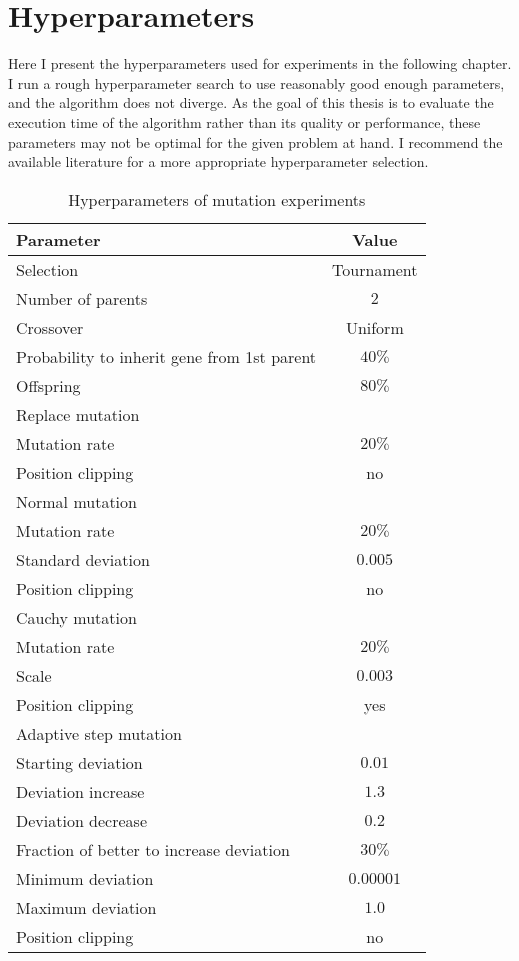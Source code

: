 \chapter{Hyperparameters}
\label{chap:hyperparameters}

Here I present the hyperparameters used for experiments in the following chapter. I run a rough hyperparameter search to use reasonably good enough parameters, and the algorithm does not diverge. As the goal of this thesis is to evaluate the execution time of the algorithm rather than its quality or performance, these parameters may not be optimal for the given problem at hand. I recommend the available literature for a more appropriate hyperparameter selection. 

\begin{table}[ht]
    \centering
    \begin{tabular}{|l|c|}
        \hline
        \textbf{Parameter} & \textbf{Value} \\
        \hline
        Selection & Tournament \\
        \quad Number of parents & $2$ \\
        Crossover & Uniform \\
        \quad Probability to inherit gene from 1st parent & $40\%$ \\
        \quad Offspring & $80\%$ \\
        \hline
        Replace mutation & \\
        \quad Mutation rate & $20\%$ \\
        \quad Position clipping & no \\
        Normal mutation & \\
        \quad Mutation rate & $20\%$ \\
        \quad Standard deviation & $0.005$ \\
        \quad Position clipping & no \\
        Cauchy mutation & \\
        \quad Mutation rate & $20\%$ \\
        \quad Scale & $0.003$ \\
        \quad Position clipping & yes \\
        Adaptive step mutation & \\
        \quad Starting deviation & $0.01$ \\
        \quad Deviation increase & $1.3$ \\
        \quad Deviation decrease & $0.2$ \\
        \quad Fraction of better to increase deviation & $30\%$ \\
        \quad Minimum deviation & $0.00001$ \\
        \quad Maximum deviation & $1.0$ \\
        \quad Position clipping & no \\
        \hline
    \end{tabular}
    \caption{Hyperparameters of mutation experiments}
    \label{tab:esmutationhyperparmarameters}
\end{table}

